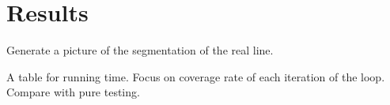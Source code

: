\section{Results}
Generate a picture of the segmentation of the real line.

A table for running time. Focus on coverage rate of each iteration of
the loop. Compare with pure testing.


